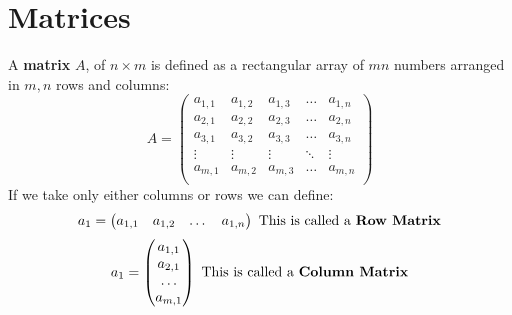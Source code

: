 \documentclass[a4paper]{article}
\begin{document}
  \section{Matrices} 
  A \textbf{matrix} $A$,  of $n \times m$ is defined as a rectangular array of $mn$ numbers arranged in $m,n$ rows and columns:
  \[
    A = \begin{pmatrix}
      a_{1,1} & a_{1,2} & a_{1,3}& \dots & a_{1,n} \\
      a_{2,1} & a_{2,2} & a_{2,3}&\dots & a_{2,n} \\
      a_{3,1} & a_{3,2} & a_{3,3}&\dots & a_{3,n} \\
      \vdots & \vdots & \vdots&\ddots & \vdots\\
      a_{m,1} & a_{m,2} & a_{m,3}&\dots & a_{m,n} \\
    \end{pmatrix}
  \]
  If we take only either columns or rows we can define:
  \[
    a_1 = \begin{pmatrix}
      a_{1,1}  & a_{1,2} & \dots & a_{1,n}
    \end{pmatrix} \textrm{ This is called a \textbf{Row Matrix}}
  \]
  \[
    a_1 = \begin{pmatrix}
      a_{1,1}  \\ a_{2,1} \\ \dots \\ a_{m,1}
    \end{pmatrix} \textrm{ This is called a \textbf{Column Matrix}}
  \]
\end{document}
